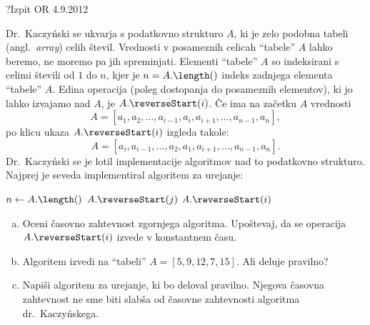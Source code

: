 \begin{naloga}{?}{Izpit OR 4.9.2012}
\begin{vprasanje}
Dr.~Kaczyński se ukvarja s podatkovno strukturo $A$,
ki je zelo podobna tabeli (angl.~{\em array}) celih števil.
Vrednosti v posameznih celicah ``tabele'' $A$ lahko beremo,
ne moremo pa jih spreminjati.
Elementi ``tabele'' $A$ so indeksirani s celimi števili od $1$ do $n$,
kjer je $n = A.\length()$ indeks zadnjega elementa ``tabele'' $A$.
Edina operacija (poleg dostopanja do posameznih elementov),
ki jo lahko izvajamo nad $A$, je $A.\reverseStart(i)$.
Če ima na začetku $A$ vrednosti
$$
A = [a_1, a_2, \dots, a_{i-1}, a_i, a_{i+1}, \dots, a_{n-1}, a_n],
$$
po klicu ukaza $A.\reverseStart(i)$ izgleda takole:
$$
A = [a_i, a_{i-1}, \dots, a_2, a_1, a_{i+1}, \dots, a_{n-1}, a_n] .
$$
Dr.~Kaczyński se je lotil implementacije algoritmov
nad to podatkovno strukturo.
Najprej je seveda implementiral algoritem za urejanje:
\begin{small}
\begin{algorithmic}
\State $n \gets A.\length()$
            \State $A.\reverseStart(j)$
            \State $A.\reverseStart(i)$
        \EndIf
    \EndFor
\EndFor
\end{algorithmic}
\end{small}

\begin{enumerate}[(a)]
\item Oceni časovno zahtevnost zgornjega algoritma.
Upoštevaj, da se operacija $A.\reverseStart(i)$ izvede v konstantnem času.

\item Algoritem izvedi na ``tabeli'' $A = [5, 9, 12, 7, 15]$.
Ali deluje pravilno?

\item Napiši algoritem za urejanje, ki bo deloval pravilno.
Njegova časovna zahtevnost ne sme biti slabša
od časovne zahtevnosti algoritma dr.~Kaczyńskega.
\end{enumerate}
\end{vprasanje}
\begin{odgovor}
\end{odgovor}
\end{naloga}
